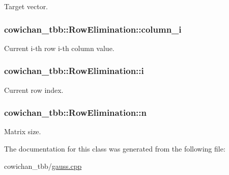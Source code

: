 Target vector. \hypertarget{classcowichan__tbb_1_1_row_elimination_2d2d59f426efd3d2c16aa6f30db8b688}{
\subsubsection[{column\_\-i}]{ {\bf cowichan\_\-tbb::RowElimination::column\_\-i}}}
\label{classcowichan__tbb_1_1_row_elimination_2d2d59f426efd3d2c16aa6f30db8b688}


Current i-th row i-th column value. \hypertarget{classcowichan__tbb_1_1_row_elimination_8e0b0b44136b0e0d5f61cd3017003574}{
\subsubsection[{i}]{ {\bf cowichan\_\-tbb::RowElimination::i}}}
\label{classcowichan__tbb_1_1_row_elimination_8e0b0b44136b0e0d5f61cd3017003574}


Current row index. \hypertarget{classcowichan__tbb_1_1_row_elimination_1d7f660f2ff6859e63d43ff83558f319}{
\subsubsection[{n}]{ {\bf cowichan\_\-tbb::RowElimination::n}}}
\label{classcowichan__tbb_1_1_row_elimination_1d7f660f2ff6859e63d43ff83558f319}


Matrix size. 

The documentation for this class was generated from the following file:\begin{CompactItemize}
\item 
cowichan\_\-tbb/\hyperlink{cowichan__tbb_2gauss_8cpp}{gauss.cpp}\end{CompactItemize}
